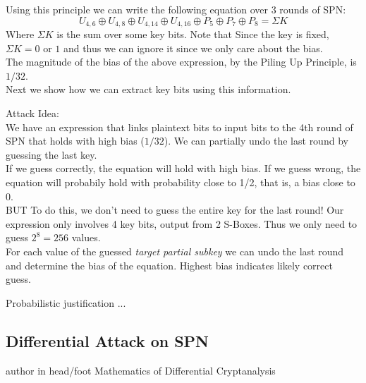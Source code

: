 \documentclass[9pt]{beamer}
\begin{document}
\begin{frame}
Using this principle we can write the following equation over 3 rounds of SPN:
\[ U_{4,6} \oplus U_{4,8} \oplus U_{4,14} \oplus U_{4, 16} \oplus P_5 \oplus P_7 \oplus P_8 = \Sigma K \]
Where $\Sigma K$ is the sum over some key bits. Note that Since the key is fixed, $\Sigma K = 0$ or $1$ and thus we can ignore it since we only care about the bias.\\
\vspace{5mm}
The magnitude of the bias of the above expression, by the Piling Up Principle, is $1/32$. \\
\vspace{5mm}
Next we show how we can extract key bits using this information.
\end{frame}

\begin{frame}
Attack Idea:\\
\vspace{3mm}
We have an expression that links plaintext bits to input bits to the 4th round of SPN that holds with high bias ($1/32$). We can partially undo the last round by guessing the last key. \\
\vspace{3mm}
\pause
If we guess correctly, the equation will hold with high bias. If we guess wrong, the equation will probabily hold with probability close to 1/2, that is, a bias close to 0.\\
\vspace{3mm}
BUT To do this, we don't need to guess the entire key for the last round! Our expression only involves 4 key bits, output from 2 S-Boxes. Thus we only need to guess $2^8 = 256$ values.\\
\vspace{3mm}
For each value of the guessed \textit{target partial subkey} we can undo the last round and determine the bias of the equation. Highest bias indicates likely correct guess.
\end{frame}

\begin{frame}
Probabilistic justification ...

\end{frame}

\subsection{Differential Attack on SPN}
\begin{frame}
\begin{beamercolorbox}[ht=2.5ex,dp=1.125ex,center,rounded=true,shadow=true]{author in head/foot}
Mathematics of Differential Cryptanalysis
\end{beamercolorbox}
\end{frame}
\end{document}
